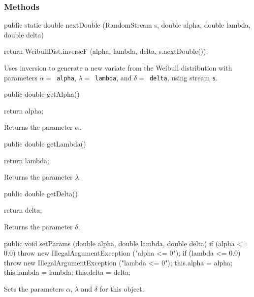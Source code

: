 \subsubsection* {Methods}
\begin{code}
   
   public static double nextDouble (RandomStream s, double alpha,
                                    double lambda, double delta) \begin{hide} {
       return WeibullDist.inverseF (alpha, lambda, delta, s.nextDouble());
   }\end{hide}
\end{code}
\begin{tabb} 
   Uses inversion to generate a new variate from the Weibull
   distribution with parameters $\alpha = $~\texttt{alpha},
   $\lambda = $~\texttt{lambda}, and $\delta = $~\texttt{delta}, using
   stream \texttt{s}.
\end{tabb}
\begin{code}      

   public double getAlpha()\begin{hide} {
      return alpha;
   }\end{hide}
\end{code} 
\begin{tabb} Returns the parameter $\alpha$.
\end{tabb}
\begin{code}

   public double getLambda()\begin{hide} {
      return lambda;
   }\end{hide}
\end{code} 
\begin{tabb} Returns the parameter $\lambda$.
\end{tabb}
\begin{code}

   public double getDelta()\begin{hide} {
      return delta;
   }\end{hide}
\end{code} 
\begin{tabb} Returns the parameter $\delta$.
\end{tabb}
\begin{hide}\begin{code}

   public void setParams (double alpha, double lambda, double delta) {
      if (alpha <= 0.0)
        throw new IllegalArgumentException ("alpha <= 0");
      if (lambda <= 0.0)
        throw new IllegalArgumentException ("lambda <= 0");
      this.alpha  = alpha;
      this.lambda = lambda;
      this.delta  = delta;
   }
\end{code} 
\begin{tabb} Sets the parameters $\alpha$, $\lambda$ and $\delta$ for this
   object.
\end{tabb}
\begin{code}
}
\end{code}
\end{hide}
